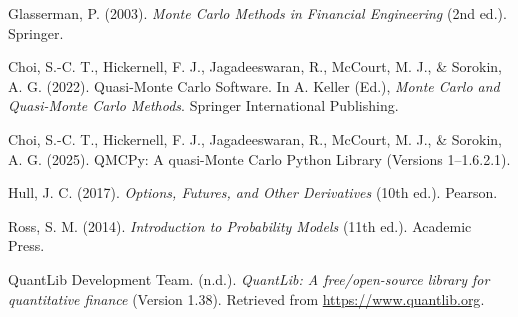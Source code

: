 \documentclass{article}
\begin{document}
\begin{thebibliography}{6}

Glasserman, P. (2003). \textit{Monte Carlo Methods in Financial Engineering} (2nd ed.). Springer.

Choi, S.-C. T., Hickernell, F. J., Jagadeeswaran, R., McCourt, M. J., \& Sorokin, A. G. (2022).
Quasi-Monte Carlo Software. In A. Keller (Ed.), \textit{Monte Carlo and Quasi-Monte Carlo Methods}.
Springer International Publishing.

Choi, S.-C. T., Hickernell, F. J., Jagadeeswaran, R., McCourt, M. J., \& Sorokin, A. G. (2025).
QMCPy: A quasi-Monte Carlo Python Library (Versions 1–1.6.2.1).

Hull, J. C. (2017). \textit{Options, Futures, and Other Derivatives} (10th ed.). Pearson.

Ross, S. M. (2014). \textit{Introduction to Probability Models} (11th ed.). Academic Press.

QuantLib Development Team. (n.d.). \textit{QuantLib: A free/open-source library for quantitative finance} (Version 1.38).
Retrieved from \url{https://www.quantlib.org}.

\end{thebibliography}


 
\end{document}
